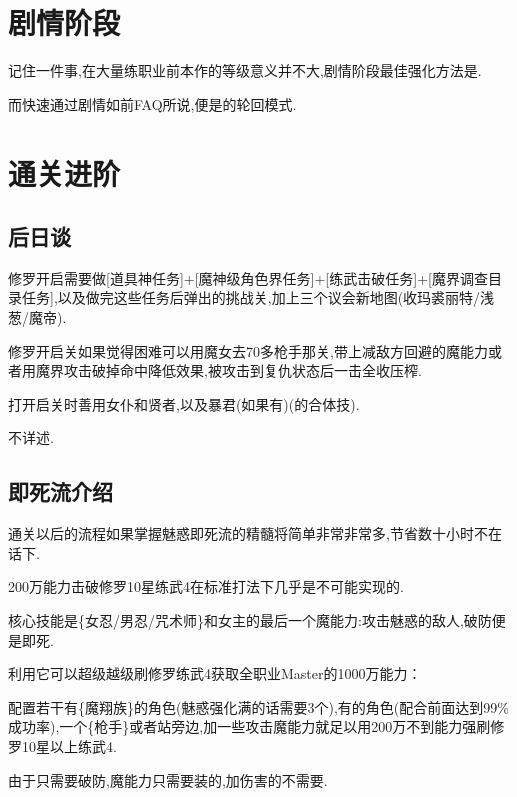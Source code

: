 \newpage

\section{剧情阶段}

记住一件事,在大量练职业前本作的等级意义并不大,剧情阶段最佳强化方法是{\color{red}{捕获+榨取+嗑药}}.

而快速通过剧情如前FAQ所说,便是{\color{red}{魔女+buff+(一触即发)+奥义捕捉+压榨+嗑药}}的轮回模式.

\newpage

\section{通关进阶}


	\subsection{后日谈}

	修罗开启需要做[道具神任务]+[魔神级角色界任务]+[练武击破任务]+[魔界调查目录任务],以及做完这些任务后弹出的挑战关,加上三个议会新地图(收玛裘丽特/浅葱/魔帝).

	修罗开启关如果觉得困难可以用魔女去70多枪手那关,带上减敌方回避的魔能力或者用魔界攻击破掉命中降低效果,被攻击到复仇状态后一击全收压榨.

	打开启关时善用女仆和贤者,以及暴君(如果有)(的合体技).

	不详述.

	\subsection{即死流介绍}

	通关以后的流程如果掌握魅惑即死流的精髓将简单非常非常多,节省数十小时不在话下.

	200万能力击破修罗10星练武4在标准打法下几乎是不可能实现的.

	核心技能是{\color{red}{魅惑魔法}}\{女忍/男忍/咒术师\}和女主的最后一个魔能力{\color{red}{生杀予夺}}:攻击魅惑的敌人,破防便是即死.

	利用它可以超级越级刷修罗练武4获取全职业Master的1000万能力：

	配置若干有{\color{red}{瘴气蔓延}}\{魔翔族\}的角色(魅惑强化满的话需要3个),有{\color{red}{强化9/范围9/魅惑}}的角色(配合前面达到99\%成功率),一个{\color{red}{辅助}}\{枪手\}或者{\color{red}{克里斯多}}站旁边,加一些攻击魔能力就足以用200万不到能力强刷修罗10星以上练武4.

	由于只需要破防,魔能力只需要装{\color{red}{加数值加攻击}}的,加伤害的不需要.

